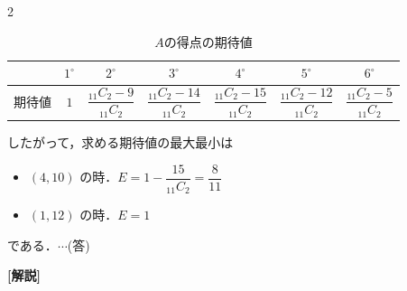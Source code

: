 \documentclass[../../main.tex]{subfiles}
\begin{document}
\begin{multicols}{2}
  \begin{table}[H]
    \centering
    \caption{$A$の得点の期待値}
    \label{1995-3:table:3}
    \begin{tabular}{|c||c|c|c|c|c|c|}
      \hline
      & $1^\circ$ & $2^\circ$                       & $3^\circ$                        & $4^\circ$                        & $5^\circ$                        & $6^\circ$                       \\
      \hline
      期待値 & $1$       & $\dfrac{_{11}C_2 - 9}{_{11}C_2}$ & $\dfrac{_{11}C_2 - 14}{_{11}C_2}$ & $\dfrac{_{11}C_2 - 15}{_{11}C_2}$ & $\dfrac{_{11}C_2 - 12}{_{11}C_2}$ & $\dfrac{_{11}C_2 - 5}{_{11}C_2}$ \\
      \hline
    \end{tabular}
  \end{table}
  したがって，求める期待値の最大最小は
  \begin{itemize}
    \item[最小] $(4, 10)$ の時．$E = 1 - \dfrac{15}{_{11}C_2} = \dfrac{8}{11}$
    \item[最大] $(1, 12)$ の時．$E = 1$
  \end{itemize}
  である．$\cdots$(答)

  {\bf [解説]}

  \newpage
\end{multicols}
\end{document}
